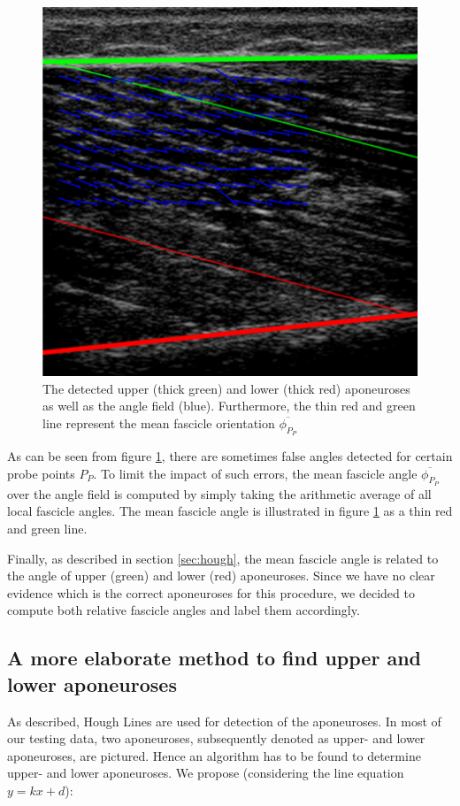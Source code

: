 \documentclass[10pt,twocolumn,letterpaper]{article}
\begin{document}
\begin{figure}
	\begin{center}		
		\includegraphics[width=1\linewidth]{img/angleField}
	\end{center}
	\caption{The detected upper (thick green) and lower (thick red) aponeuroses as well as the angle field (blue). Furthermore, the thin red and green line represent the mean fascicle orientation $\overline{\phi_{P_P}}$ }
	\label{fig:angleField}
	
\end{figure}

As can be seen from figure \ref{fig:angleField}, there are sometimes false angles detected for certain probe points $P_P$. To limit the impact of such errors, the mean fascicle angle $\overline{\phi_{P_P}}$ over the angle field is computed by simply taking the arithmetic average of all local fascicle angles. The mean fascicle angle is illustrated in figure \ref{fig:angleField} as a thin red and green line.

Finally, as described in section \ref{sec:hough}, the mean fascicle angle is related to the angle of upper (green) and lower (red) aponeuroses. Since we have no clear evidence which is the correct aponeuroses for this procedure, we decided to compute both relative fascicle angles and label them accordingly.  

\subsection{A more elaborate method to find upper and lower aponeuroses}
As described, Hough Lines are used for detection of the aponeuroses. In most of our testing data, two aponeuroses, subsequently denoted as upper- and lower aponeuroses, are pictured. Hence an algorithm has to be found to determine upper- and lower aponeuroses. We propose (considering the line equation $y = kx +d $):
\end{document}
